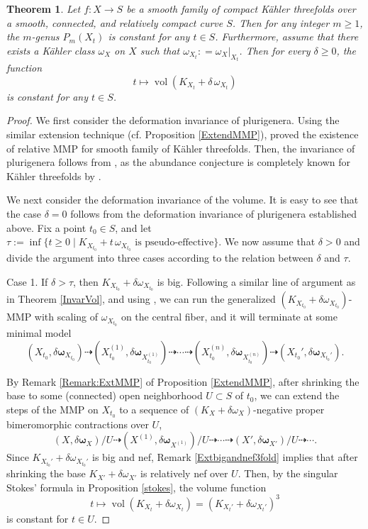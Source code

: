 \documentclass[12pt]{amsart}
\numberwithin{equation}{section}
\newtheorem{theorem} {Theorem} [section]
\theoremstyle{definition}
\theoremstyle{plain}
\newtheorem*{thm A*}{Theorem A}
\newtheorem*{thm B*}{Theorem B}
\newtheorem*{thm C*}{Theorem C}
\newtheorem*{thm D*}{Theorem D}
\theoremstyle{definition}
\renewcommand{\1}{\mathds{1}}
\renewcommand{\>}{\rightarrow}
\begin{document}
\begin{theorem}\label{DefVol3fold}
Let $f: X \to S$ be a smooth family of compact K\"ahler threefolds over a smooth, connected, and relatively compact curve $S$. Then for any integer $m\ge 1$, the $m$-genus $P_m(X_t)$ is constant for any $t\in S$. Furthermore, assume that there exists a K\"ahler class $\omega_X$ on $X$ such that $\omega_{X_t} :  =  \omega_X |_{X_t}$. Then for every $\delta\ge 0$, the function $$t \longmapsto \operatorname{vol}(K_{X_t}+\delta\,\omega_{X_t})$$is constant for any $t\in S$.
\end{theorem}
\begin{proof}
We first consider the deformation invariance of plurigenera. Using the similar extension technique (cf. Proposition \ref{ExtendMMP}), \cite[Theorem 1.2]{DHP24} proved the existence of relative MMP for smooth family of K\"ahler threefolds. Then, the invariance of plurigenera follows from \cite[Theorem 11]{Naka86}, as the abundance conjecture is completely known for K\"ahler threefolds by \cite{CHP16, CHP23Erratum, DO24, DO24II}. 

We next consider the deformation invariance of the volume. It is easy to see that the case $\delta=0$ follows from the deformation invariance of plurigenera established above. Fix a point $t_0 \in S$, and let $
\tau := \inf\{ t \ge 0 \mid K_{X_{t_0}} + t\,\omega_{X_{t_0}} \text{ is pseudo-effective} \}$. We now assume that $\delta>0$ and divide the argument into three cases according to the relation between $\delta$ and $\tau$.


Case 1. If $\delta >  \tau$, then $K_{X_{t_0}}+ \delta{\omega}_{X_{t_0}}$ is big. Following a similar line of argument as in Theorem \ref{InvarVol}, and using \cite[Theorem 1.4]{DH24}, we can run the generalized $(K_{X_{t_0}} + \delta {\omega}_{X_{t_0}})$-MMP with scaling of $\omega_{X_{t_0}}$ on the central fiber, and it will terminate at some minimal model $$(X_{t_0},\delta \boldsymbol{\omega}_{X_{t_0}}) \dashrightarrow (X_{t_0}^{(1)} , \delta \boldsymbol{\omega}_{X_{t_0}^{(1)}})\dashrightarrow  \cdots \dashrightarrow (X_{t_0}^{(n)}, \delta \boldsymbol{\omega}_{X_{t_0}^{(n)}}) \dashrightarrow (X_{t_0}', \delta \boldsymbol{\omega}_{X_{t_0}'}).$$

By Remark \ref{Remark:ExtMMP} of Proposition \ref{ExtendMMP}, after shrinking the base to some (connected) open neighborhood $U \subset S$ of ${t_0}$, we can extend the steps of the MMP on $X_{t_0}$ to a sequence of $(K_X+ \delta{\omega}_X)$-negative proper bimeromorphic contractions over $U$, $$(X , \delta \boldsymbol{\omega}_X)/U \dashrightarrow (X^{(1)},\delta \boldsymbol{\omega}_{X^{(1)}})/U \dashrightarrow \cdots \dashrightarrow (X', \delta \boldsymbol{\omega}_{X'})/U\dashrightarrow \cdots.$$
Since $K_{X_{t_0}'} + \delta {\omega}_{X_{t_0}'}$ is big and nef, Remark \ref{Extbigandnef3fold} implies that after shrinking the base $K_{X'} + \delta {\omega}_{X'}$ is relatively nef over $U$. Then, by the singular Stokes' formula in Proposition \ref{stokes}, the volume function $$t \longmapsto \operatorname{vol}\!\left(K_{X_t}+\delta {\omega}_{X_t}\right) = (K_{X_t'}+ \delta{\omega}_{X_t'})^3$$
is constant for $t\in U$.


\end{proof}
\end{document}
